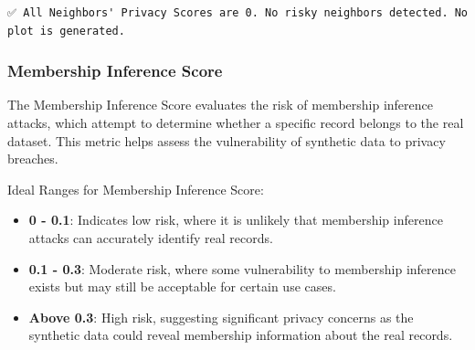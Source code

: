 \documentclass[
  letterpaper,
  DIV=11,
  numbers=noendperiod]{scrartcl}
\providecommand{\tightlist}{%
  \setlength{\itemsep}{0pt}\setlength{\parskip}{0pt}}\usepackage{longtable,booktabs,array}
\begin{document}
\begin{verbatim}
✅ All Neighbors' Privacy Scores are 0. No risky neighbors detected. No plot is generated.
\end{verbatim}

\subsubsection{Membership Inference
Score}\label{membership-inference-score}

The Membership Inference Score evaluates the risk of membership
inference attacks, which attempt to determine whether a specific record
belongs to the real dataset. This metric helps assess the vulnerability
of synthetic data to privacy breaches.

Ideal Ranges for Membership Inference Score:

\begin{itemize}
\tightlist
\item
  \textbf{0 - 0.1}: Indicates low risk, where it is unlikely that
  membership inference attacks can accurately identify real records.
\item
  \textbf{0.1 - 0.3}: Moderate risk, where some vulnerability to
  membership inference exists but may still be acceptable for certain
  use cases.
\item
  \textbf{Above 0.3}: High risk, suggesting significant privacy concerns
  as the synthetic data could reveal membership information about the
  real records.
\end{itemize}
\end{document}
